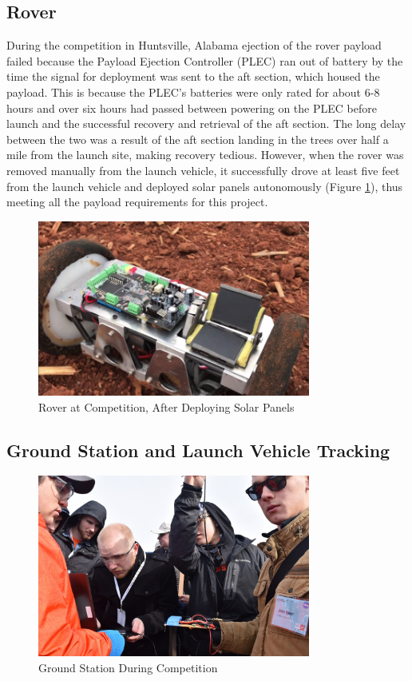 \documentclass[onecolumn, draftclsnofoot, 10pt, compsoc]{IEEEtran}
\begin{document}
\subsection{Rover}
During the competition in Huntsville, Alabama ejection of the rover payload failed because the Payload Ejection Controller (PLEC) ran out of battery by the time the signal for deployment was sent to the aft section, which housed the payload. This is because the PLEC's batteries were only rated for about 6-8 hours and over six hours had passed between powering on the PLEC before launch and the successful recovery and retrieval of the aft section. The long delay between the two was a result of the aft section landing in the trees over half a mile from the launch site, making recovery tedious. However, when the rover was removed manually from the launch vehicle, it successfully drove at least five feet from the launch vehicle and deployed solar panels autonomously (Figure \ref{figure:Rover at Competition}), thus meeting all the payload requirements for this project.

\begin{figure}[H]
	\centering
	\includegraphics[width=0.8\textwidth]{rover.png}
	\caption{Rover at Competition, After Deploying Solar Panels}
    \label{figure:Rover at Competition}
\end{figure}

\subsection{Ground Station and Launch Vehicle Tracking}

\begin{figure}[H]
	\centering
	\includegraphics[width=0.8\textwidth]{ground_station.JPG}
	\caption{Ground Station During Competition}
    \label{figure:Ground Station}
\end{figure}
\end{document}
